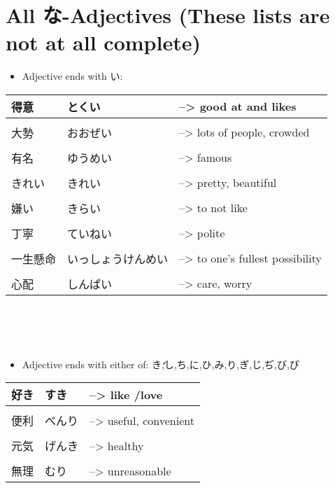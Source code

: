 \documentclass{article}
\begin{document}

\section{All な-Adjectives (These lists are not at all complete)}
\begin{itemize}
\item Adjective ends with い: \\
\end{itemize}
\begin{tabular}{ p{1.41cm} | p{3.4cm} l }
得意&とくい&--> good at and likes \\ \hline\\[-1em]
大勢 &おおぜい&--> lots of people, crowded\\ \hline\\[-1em]
有名 &ゆうめい&--> famous\\ \hline\\[-1em]
きれい &きれい&--> pretty, beautiful \\ \hline\\[-1em]
嫌い&きらい&--> to not like\\ \hline\\[-1em]
丁寧 &ていねい &--> polite\\ \hline\\[-1em]
一生懸命&いっしょうけんめい&--> to one’s fullest possibility\\ \hline\\[-1em]
心配&しんぱい&--> care, worry %
\end{tabular} \\ \\ \\
\begin{itemize}
\item Adjective ends with either of: \'き,し,ち,に,ひ,み,り,ぎ,じ,ぢ,び,ぴ\' \\
\end{itemize}
\begin{tabular}{ p{1.41cm} | p{3.4cm} l }
好き&すき&--> like /love\\ \hline\\[-1em]
便利&べんり&--> useful, convenient\\ \hline\\[-1em]
元気&げんき&--> healthy\\ \hline\\[-1em]
無理 	&むり 	&--> unreasonable %
\end{tabular} \\ \\ \\
\end{document}
